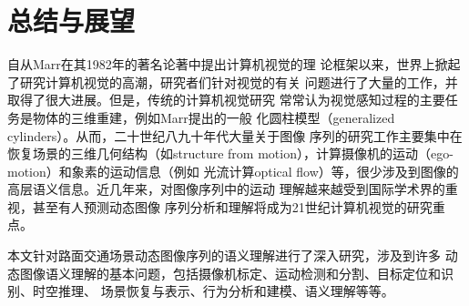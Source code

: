 \chapter{总结与展望}
\label{chap10}

自从Marr在其1982年的著名论著\cite{Marr:1982}中提出计算机视觉的理
论框架以来，世界上掀起了研究计算机视觉的高潮，研究者们针对视觉的有关
问题进行了大量的工作，并取得了很大进展。但是，传统的计算机视觉研究
常常认为视觉感知过程的主要任务是物体的三维重建，例如Marr提出的一般
化圆柱模型（generalized
cylinders）\cite{Marr:1982}。从而，二十世纪八九十年代大量关于图像
序列的研究工作主要集中在恢复场景的三维几何结构（如structure from
motion），计算摄像机的运动（ego-motion）和象素的运动信息（例如 光流计算optical
flow）等，很少涉及到图像的高层语义信息。近几年来，对图像序列中的运动
理解越来越受到国际学术界的重视，甚至有人预测动态图像
序列分析和理解将成为21世纪计算机视觉的研究重点。

本文针对路面交通场景动态图像序列的语义理解进行了深入研究，涉及到许多
动态图像语义理解的基本问题，包括摄像机标定、运动检测和分割、目标定位和识别、时空推理、
场景恢复与表示、行为分析和建模、语义理解等等。 